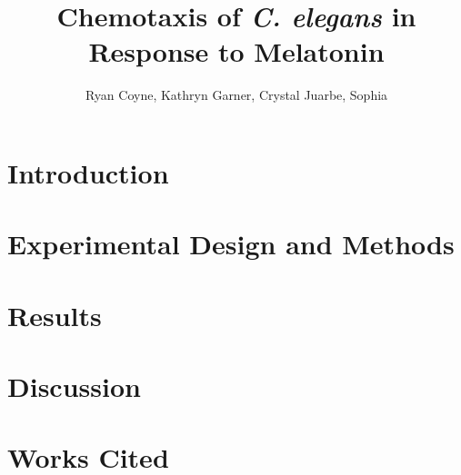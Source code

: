 \documentclass[11pt]{article}
\begin{document}
    \title{Chemotaxis of \emph{C. elegans} in Response to Melatonin}
    \author{Ryan Coyne, Kathryn Garner, Crystal Juarbe, Sophia}
    \maketitle

    \section*{Introduction}
        
    \section*{Experimental Design and Methods}

    \section*{Results}

    \section*{Discussion}

    \section*{Works Cited}
        
\end{document}
